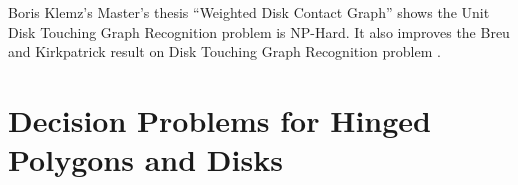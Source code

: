 \documentclass[10pt]{CSUNthesis}
\theoremstyle{plain}%
\theoremstyle{definition}
\theoremstyle{remark}
\begin{document}
Boris Klemz's Master's thesis ``Weighted Disk Contact Graph'' shows the Unit Disk Touching Graph Recognition problem is NP-Hard.  
It also improves the Breu and Kirkpatrick result on Disk Touching Graph Recognition problem \cite{klemzthesis,BK98}.\chapter{Decision Problems for Hinged Polygons and Disks}\label{chapter:logicEngine}
\end{document}
